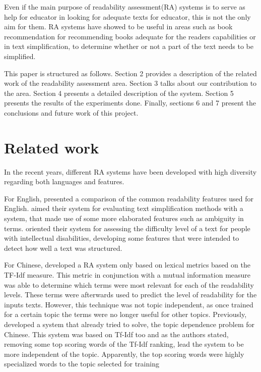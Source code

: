\documentclass{acm_proc_article-sp}
\begin{document}
Even if the main purpose of readability assessment(RA) systems is to serve as help for educator in looking for adequate texts for educator, this is not the only aim for them. RA systems have showed to be useful in areas such as book recommendation \cite{pera2014automating} for recommending books adequate for the readers capabilities or in text simplification, to determine whether or not a part of the text needs to be simplified.

 This paper is structured as follows. Section 2 provides a description of the related work of the readability assessment area. Section 3 talks about our contribution to the area. Section 4 presents a detailed description of the system. Section 5 presents the results of the experiments done. Finally, sections 6 and 7 present the conclusions and future work of this project.


\section{Related work}
In the recent years, different RA systems have been developed with high diversity regarding both languages and features. 

For English, \cite{feng2010comparison} presented a comparison of the common readability features used for English. \cite{aluisio2010readability} aimed their system for evaluating text simplification methods with a system, that made use of some more elaborated features such as ambiguity in terms. \cite{feng2009automatic} oriented their system for assessing the difficulty level of a text for people with intellectual disabilities, developing some features that were intended to detect how well a text was structured.   

For Chinese, \cite{chen2011chinese} developed a RA system only based on lexical metrics based on the TF-Idf measure. This metric in conjunction with a mutual information measure was able to determine which terms were most relevant for each of the readability levels. These terms were afterwards used to predict the level of readability for the inputs texts. However, this technique was not topic independent, as once trained for a certain topic the terms were no longer useful for other topics. Previously, \cite{collins2004language} developed a system that already tried to solve, the topic dependence problem for Chinese. This system was based on Tf-Idf too and as the authors stated, removing some top scoring words of the Tf-Idf ranking, lead the system to be more independent of the topic. Apparently, the top scoring words were highly specialized words to the topic selected for training
\end{document}
